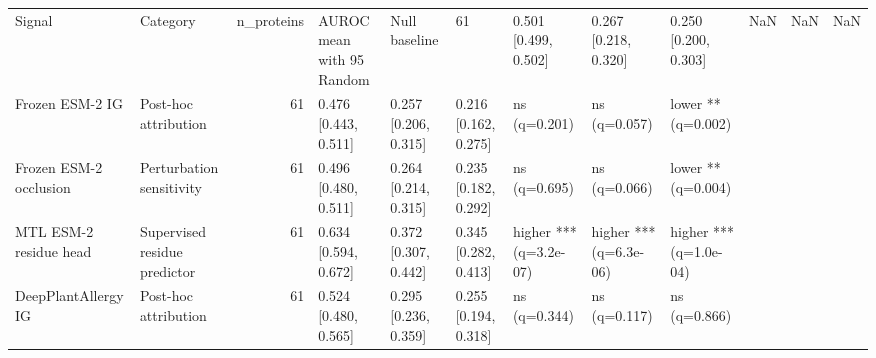 \begin{tabular}{llrllllll}
\toprule
Signal & Category & n_proteins & AUROC mean with 95%
\midrule
Random & Null baseline & 61 & 0.501 [0.499, 0.502] & 0.267 [0.218, 0.320] & 0.250 [0.200, 0.303] & NaN & NaN & NaN \\
Frozen ESM-2 IG & Post-hoc attribution & 61 & 0.476 [0.443, 0.511] & 0.257 [0.206, 0.315] & 0.216 [0.162, 0.275] & ns (q=0.201) & ns (q=0.057) & lower ** (q=0.002) \\
Frozen ESM-2 occlusion & Perturbation sensitivity & 61 & 0.496 [0.480, 0.511] & 0.264 [0.214, 0.315] & 0.235 [0.182, 0.292] & ns (q=0.695) & ns (q=0.066) & lower ** (q=0.004) \\
MTL ESM-2 residue head & Supervised residue predictor & 61 & 0.634 [0.594, 0.672] & 0.372 [0.307, 0.442] & 0.345 [0.282, 0.413] & higher *** (q=3.2e-07) & higher *** (q=6.3e-06) & higher *** (q=1.0e-04) \\
DeepPlantAllergy IG & Post-hoc attribution & 61 & 0.524 [0.480, 0.565] & 0.295 [0.236, 0.359] & 0.255 [0.194, 0.318] & ns (q=0.344) & ns (q=0.117) & ns (q=0.866) \\
\bottomrule
\end{tabular}
